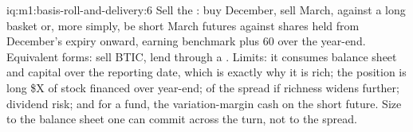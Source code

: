 \begin{solution}{iq:m1:basis-roll-and-delivery:6}
Sell the : buy December, sell March, against a long basket or, more
simply, be short March futures against shares held from December's expiry
onward, earning benchmark plus 60 over the year-end. Equivalent forms: sell
BTIC, lend through a . Limits: it consumes balance sheet
and capital over the reporting date, which is exactly why it is rich; the
position is long \$X of stock financed over year-end;  of the
spread if richness widens further; dividend risk; and for a fund, the
variation-margin cash on the short future. Size to the balance sheet one can
commit across the turn, not to the spread.
\end{solution}
